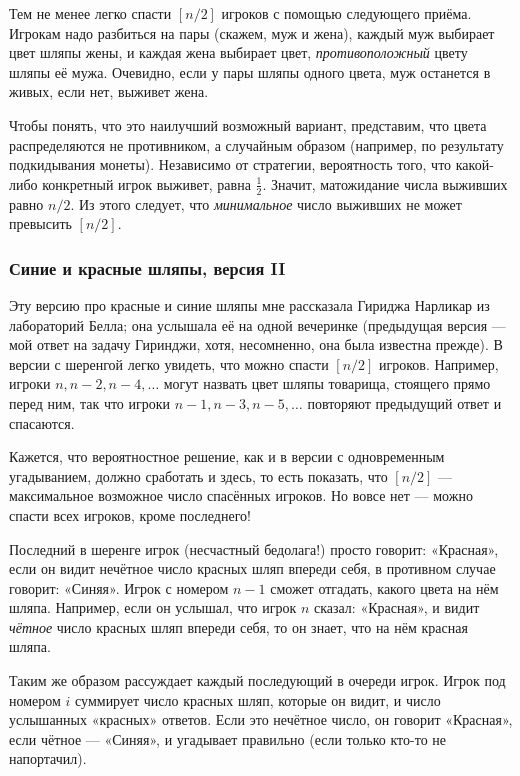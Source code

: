 \medskip

Тем не менее легко спасти $[n/2]$ игроков с помощью следующего приёма.
Игрокам надо разбиться на пары (скажем, муж и жена), каждый муж выбирает цвет шляпы жены, и каждая жена выбирает цвет, \emph{противоположный} цвету шляпы её мужа.
Очевидно, если у пары шляпы одного цвета, муж останется в живых, если нет, выживет жена.

Чтобы понять, что это наилучший возможный вариант, представим, что цвета распределяются не противником, а случайным образом (например, по результату подкидывания монеты).
Независимо от стратегии, вероятность того, что какой-либо конкретный игрок выживет, равна $\tfrac12$.
Значит, матожидание числа выживших равно $n/2$. 
Из этого следует, что \emph{минимальное} число выживших не может превысить $[n/2]$.\heart

\subsubsection*{Синие и красные шляпы, версия II}%

Эту версию про красные и синие шляпы мне рассказала Гириджа Нарликар из лабораторий Белла; %
она услышала её на одной вечеринке (предыдущая версия --- мой ответ на задачу Гиринджи, хотя, несомненно, она была известна прежде).
В версии с шеренгой легко увидеть, что можно спасти $[n/2]$ игроков.
Например, игроки $n, n-2, n-4,\dots$
могут назвать цвет шляпы товарища, стоящего прямо перед ним, так что игроки $n-1, n-3,n-5,\dots$
повторяют предыдущий ответ и спасаются.

\medskip

Кажется, что вероятностное решение, как и в версии с одновременным угадыванием, должно сработать и здесь, то есть показать, что $[n/2]$ --- максимальное возможное число спасённых игроков.
Но вовсе нет --- можно спасти всех игроков, кроме последнего!

Последний в шеренге игрок (несчастный бедолага!) просто говорит:
«Красная», если он видит нечётное число красных шляп впереди себя, в противном случае говорит: «Синяя».
Игрок с номером $n-1$ сможет отгадать, какого цвета на нём шляпа.
Например, если он услышал, что игрок $n$ сказал:
«Красная», и видит \emph{чётное} число красных шляп впереди себя, то он знает, что на нём красная шляпа.

Таким же образом рассуждает каждый последующий в очереди игрок.
Игрок под номером $i$ суммирует число красных шляп, которые он видит, и число услышанных «красных» ответов.
Если это нечётное число, он говорит «Красная», если чётное --- «Синяя», и угадывает правильно (если только кто-то не напортачил).

